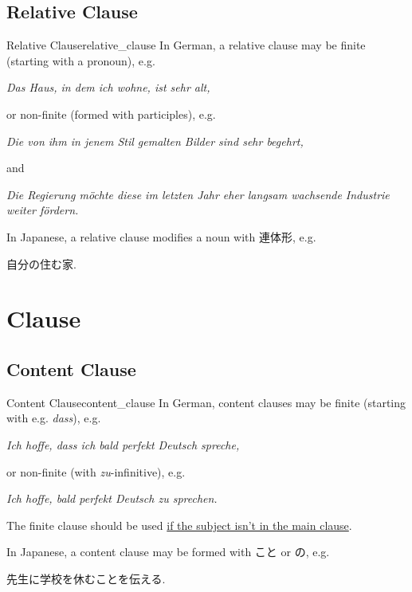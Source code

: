 \documentclass{article}
\begin{document}
\subsection{Relative Clause}

\begin{example}{Relative Clause}{relative_clause}
    In German, a relative clause may be finite (starting with a pronoun), e.g.
    \begin{center}
        \textit{Das Haus, in dem ich wohne, ist sehr alt,}
    \end{center}
    or non-finite (formed with participles), e.g.
    \begin{center}
        \textit{Die von ihm in jenem Stil gemalten Bilder sind sehr begehrt,}\\
    \end{center}
    and
    \begin{center}
        \textit{Die Regierung möchte diese im letzten Jahr eher langsam wachsende Industrie weiter fördern.}
    \end{center}
    In Japanese, a relative clause modifies a noun with 連体形, e.g.
    \begin{center}
        自分の住む家.
    \end{center}
\end{example}

\section{Clause}

\subsection{Content Clause}

\begin{example}{Content Clause}{content_clause}
    In German, content clauses may be finite (starting with e.g. \textit{dass}), e.g.
    \begin{center}
        \textit{Ich hoffe, dass ich bald perfekt Deutsch spreche,}
    \end{center}
    or non-finite (with \textit{zu}-infinitive), e.g.
    \begin{center}
        \textit{Ich hoffe, bald perfekt Deutsch zu sprechen.}
    \end{center}
    The finite clause should be used \href{https://en.easy-deutsch.de/sentence-structure/infinitive-with-zu/}{if the subject isn't in the main clause}.
    \par
    In Japanese, a content clause may be formed with こと or の, e.g.
    \begin{center}
        先生に学校を休むことを伝える.
    \end{center}
\end{example}
\end{document}
